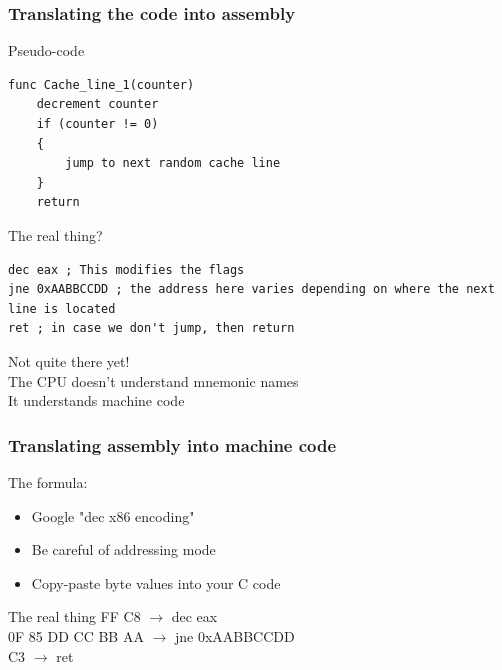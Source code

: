 \documentclass{beamer}
\begin{document}
\begin{frame}[fragile]
\frametitle{Translating the code into assembly}
\begin{block}{Pseudo-code}
\begin{lstlisting}[style=code]
func Cache_line_1(counter)
    decrement counter
    if (counter != 0)
    {
        jump to next random cache line
    }
    return
\end{lstlisting}
\end{block}
\begin{block}{The real thing?}
\begin{lstlisting}[style=code]
dec eax ; This modifies the flags
jne 0xAABBCCDD ; the address here varies depending on where the next line is located
ret ; in case we don't jump, then return
\end{lstlisting}
\end{block}
Not quite there yet!\\
The CPU doesn't understand mnemonic names\\
It understands machine code
\end{frame}

\begin{frame}[fragile]
\frametitle{Translating assembly into machine code}
The formula:\\
\begin{itemize}
\item Google "dec x86 encoding"
\item Be careful of addressing mode
\item Copy-paste byte values into your C code
\end{itemize}
\begin{block}{The real thing}
FF C8 $\rightarrow$ dec eax\\
0F 85 DD CC BB AA $\rightarrow$ jne 0xAABBCCDD\\
C3 $\rightarrow$ ret
\end{block}
\end{frame}
\end{document}
